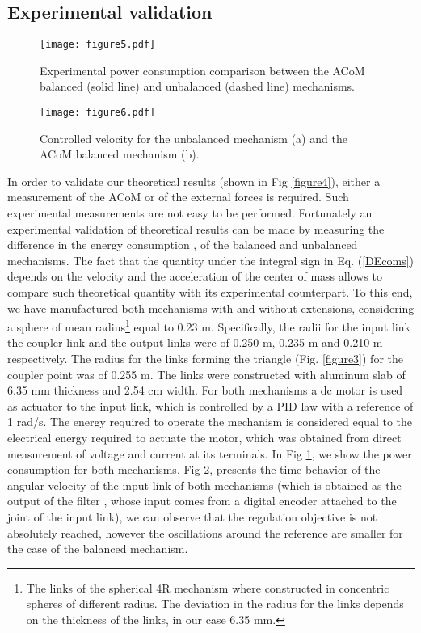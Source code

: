 \documentclass[11pt]{article}
\begin{document}
\subsection{Experimental validation}
\begin{figure}[htb]
\begin{center}
\texttt{[image: figure5.pdf]} 
\caption{Experimental power consumption comparison between the ACoM 
balanced (solid line) and unbalanced (dashed line) mechanisms.}
\label{figure5}
\end{center}
\end{figure}
\begin{figure}[htb]
\begin{center}
\texttt{[image: figure6.pdf]} 
\caption{Controlled velocity for the unbalanced mechanism (a) 
and the ACoM balanced mechanism (b).}
\label{figure6}
\end{center}
\end{figure}
In order to validate our theoretical results (shown in Fig 
\ref{figure4}), either a measurement of the ACoM or of the external 
forces is required. Such experimental measurements are not easy to be 
performed. Fortunately an experimental validation of theoretical results 
can be made by measuring the difference in the energy consumption  
, of the balanced and unbalanced mechanisms. The fact 
that the quantity under the integral sign in Eq. (\ref{DEcoms}) depends 
on the velocity and the acceleration of the center of mass allows to 
compare such theoretical quantity with its experimental counterpart.
To this end, we have manufactured 
both mechanisms with and without extensions, considering a sphere of 
mean radius\footnote{The links of the spherical 4R mechanism where 
constructed in concentric spheres of different radius. The deviation in 
the radius for the links depends on the thickness of the links, in our 
case 6.35 mm.} equal to 0.23 m. Specifically, the radii for the input link 
the coupler link and the output links were of 0.250 m, 0.235 m and 0.210 m 
respectively. The radius for the links forming the triangle (Fig. \ref{figure3}) 
for the coupler point was of 0.255 m.
The links were constructed with aluminum 
slab of 6.35 mm thickness and 2.54 cm width. For both mechanisms a dc 
motor is used as actuator to the input link, which is controlled by a 
PID law with a reference of 1 rad/s. The energy required to operate the 
mechanism is considered equal to the electrical energy required to 
actuate the motor, which was obtained from direct measurement of voltage 
and current at its terminals. In Fig \ref{figure5}, we show the power 
consumption for both mechanisms. Fig \ref{figure6}, presents the time 
behavior of the angular velocity of the input link of both mechanisms 
(which is obtained as the output of the filter , 
whose input comes from a digital encoder attached to the joint of the 
input link), we can observe that the regulation objective is not 
absolutely reached, however the oscillations around the reference are 
smaller for the case of the balanced mechanism. 
\end{document}
